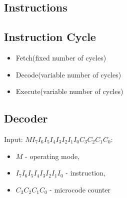 \documentclass[a4paper]{article}
\begin{document}
\pagebreak

\subsection{Instructions}

\subsection{Instruction Cycle}
\begin{itemize}
    \item Fetch(fixed number of cycles)
    \item Decode(variable number of cycles)
    \item Execute(variable number of cycles)
\end{itemize}

\subsection{Decoder}
Input: \texttt{$MI_7I_6I_5I_4I_3I_2I_1I_0C_3C_2C_1C_0$}:
\begin{itemize}
    \item \texttt{$M$} - operating mode, 
    \item \texttt{$I_7I_6I_5I_4I_3I_2I_1I_0$} - instruction, 
    \item \texttt{$C_3C_2C_1C_0$} - microcode counter
\end{itemize}

\pagebreak

%
\end{document}
